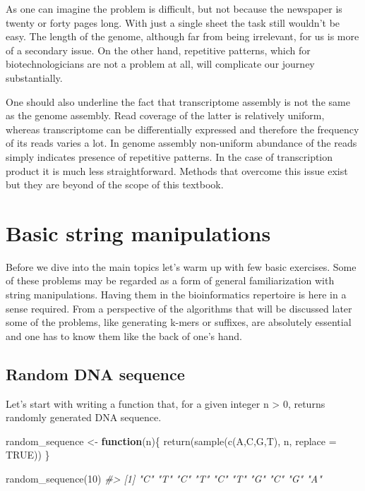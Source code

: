 \documentclass[
]{book}
\newenvironment{Shaded}{\begin{snugshade}}{\end{snugshade}}
\newcommand{\AttributeTok}[1]{\textcolor[rgb]{0.77,0.63,0.00}{#1}}
\newcommand{\CommentTok}[1]{\textcolor[rgb]{0.56,0.35,0.01}{\textit{#1}}}
\newcommand{\ConstantTok}[1]{\textcolor[rgb]{0.00,0.00,0.00}{#1}}
\newcommand{\ControlFlowTok}[1]{\textcolor[rgb]{0.13,0.29,0.53}{\textbf{#1}}}
\newcommand{\DecValTok}[1]{\textcolor[rgb]{0.00,0.00,0.81}{#1}}
\newcommand{\FunctionTok}[1]{\textcolor[rgb]{0.00,0.00,0.00}{#1}}
\newcommand{\NormalTok}[1]{#1}
\newcommand{\OtherTok}[1]{\textcolor[rgb]{0.56,0.35,0.01}{#1}}
\newcommand{\StringTok}[1]{\textcolor[rgb]{0.31,0.60,0.02}{#1}}
\begin{document}
As one can imagine the problem is difficult, but not because the newspaper is twenty or forty pages long. With just a single sheet the task still wouldn't be easy. The length of the genome, although far from being irrelevant, for us is more of a secondary issue. On the other hand, repetitive patterns, which for biotechnologicians are not a problem at all, will complicate our journey substantially.

One should also underline the fact that transcriptome assembly is not the same as the genome assembly. Read coverage of the latter is relatively uniform, whereas transcriptome can be differentially expressed and therefore the frequency of its reads varies a lot. In genome assembly non-uniform abundance of the reads simply indicates presence of repetitive patterns. In the case of transcription product it is much less straightforward. Methods that overcome this issue exist but they are beyond of the scope of this textbook.

\hypertarget{basic}{%
\chapter{Basic string manipulations}\label{basic}}

Before we dive into the main topics let's warm up with few basic exercises. Some of these problems may be regarded as a form of general familiarization with string manipulations. Having them in the bioinformatics repertoire is here in a sense required. From a perspective of the algorithms that will be discussed later some of the problems, like generating k-mers or suffixes, are absolutely essential and one has to know them like the back of one's hand.

\hypertarget{random-dna-sequence}{%
\section{Random DNA sequence}\label{random-dna-sequence}}

Let's start with writing a function that, for a given integer n \textgreater{} 0, returns randomly generated DNA sequence.

\begin{Shaded}
\begin{Highlighting}[]
\NormalTok{random\_sequence }\OtherTok{\textless{}{-}} \ControlFlowTok{function}\NormalTok{(n)\{}
  \FunctionTok{return}\NormalTok{(}\FunctionTok{sample}\NormalTok{(}\FunctionTok{c}\NormalTok{(}\StringTok{\textquotesingle{}A\textquotesingle{}}\NormalTok{,}\StringTok{\textquotesingle{}C\textquotesingle{}}\NormalTok{,}\StringTok{\textquotesingle{}G\textquotesingle{}}\NormalTok{,}\StringTok{\textquotesingle{}T\textquotesingle{}}\NormalTok{), n, }\AttributeTok{replace =} \ConstantTok{TRUE}\NormalTok{))}
\NormalTok{\}}

\FunctionTok{random\_sequence}\NormalTok{(}\DecValTok{10}\NormalTok{)}
\CommentTok{\#\textgreater{}  [1] "C" "T" "C" "T" "C" "T" "G" "C" "G" "A"}
\end{Highlighting}
\end{Shaded}
\end{document}
